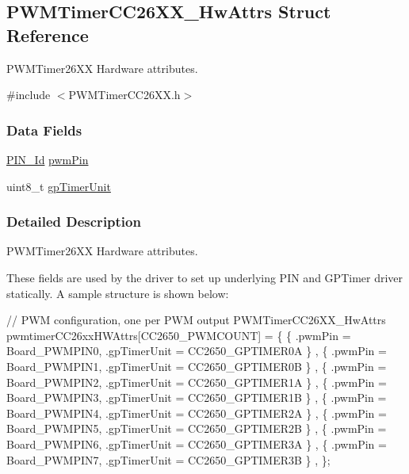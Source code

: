 \subsection{P\+W\+M\+Timer\+C\+C26\+X\+X\+\_\+\+Hw\+Attrs Struct Reference}
\label{struct_p_w_m_timer_c_c26_x_x___hw_attrs}


P\+W\+M\+Timer26\+X\+X Hardware attributes.  




{\ttfamily \#include $<$P\+W\+M\+Timer\+C\+C26\+X\+X.\+h$>$}

\subsubsection*{Data Fields}
\begin{DoxyCompactItemize}
\item 
\hyperlink{_p_i_n_8h_a9ae8197f460bb76ea09a84f47d09921f}{P\+I\+N\+\_\+\+Id} \hyperlink{struct_p_w_m_timer_c_c26_x_x___hw_attrs_a51bf646e2e56d0dbe1c3b79af314af08}{pwm\+Pin}
\item 
uint8\+\_\+t \hyperlink{struct_p_w_m_timer_c_c26_x_x___hw_attrs_a82c34a1970bf960c04b72f28ecebe1c8}{gp\+Timer\+Unit}
\end{DoxyCompactItemize}


\subsubsection{Detailed Description}
P\+W\+M\+Timer26\+X\+X Hardware attributes. 

These fields are used by the driver to set up underlying P\+I\+N and G\+P\+Timer driver statically. A sample structure is shown below\+:


\begin{DoxyCode}
\textcolor{comment}{// PWM configuration, one per PWM output}
PWMTimerCC26XX_HwAttrs pwmtimerCC26xxHWAttrs[CC2650\_PWMCOUNT] = \{
 \{ .pwmPin = Board\_PWMPIN0, .gpTimerUnit = CC2650\_GPTIMER0A \} ,
 \{ .pwmPin = Board\_PWMPIN1, .gpTimerUnit = CC2650\_GPTIMER0B \} ,
 \{ .pwmPin = Board\_PWMPIN2, .gpTimerUnit = CC2650\_GPTIMER1A \} ,
 \{ .pwmPin = Board\_PWMPIN3, .gpTimerUnit = CC2650\_GPTIMER1B \} ,
 \{ .pwmPin = Board\_PWMPIN4, .gpTimerUnit = CC2650\_GPTIMER2A \} ,
 \{ .pwmPin = Board\_PWMPIN5, .gpTimerUnit = CC2650\_GPTIMER2B \} ,
 \{ .pwmPin = Board\_PWMPIN6, .gpTimerUnit = CC2650\_GPTIMER3A \} ,
 \{ .pwmPin = Board\_PWMPIN7, .gpTimerUnit = CC2650\_GPTIMER3B \} ,
\};
\end{DoxyCode}
 


